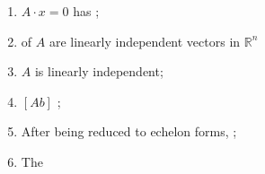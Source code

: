 \begin{enumerate}
\begin{enumerate}
      \item $ A \cdot x = 0 $ has ;
      
      \item {} of $ A $ are 
      linearly independent vectors in $ \mathbb{R}^{n} $
      
      \item $ A $ is linearly independent;
      
      \item $ \left[ A b \right] $ ;
      
      \item After being reduced to echelon forms, 
      ;
      
      \item The 
    \end{enumerate}
  \end{enumerate}
